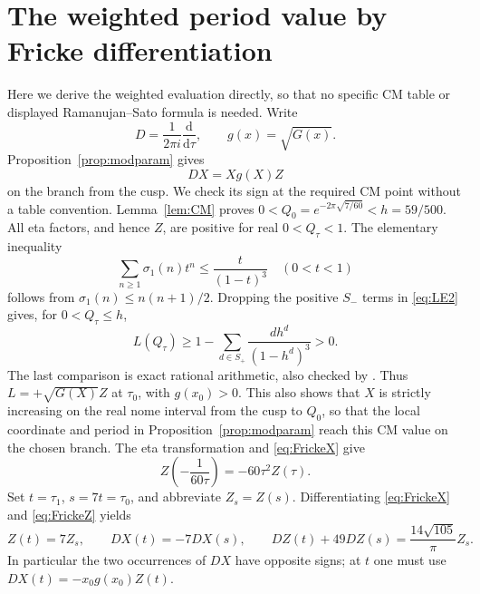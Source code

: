\documentclass[11pt,a4paper]{article}
\theoremstyle{remark}
\newcommand{\dd}{\mathrm d}
\newcommand{\code}[1]{\path{#1}}
\begin{document}
\section{The weighted period value by Fricke differentiation}
Here we derive the weighted evaluation directly, so that no specific
CM table or displayed Ramanujan--Sato formula is needed. Write
\[
 D=\frac1{2\pi i}\frac{\dd}{\dd\tau},\qquad g(x)=\sqrt{G(x)}.
\]
Proposition~\ref{prop:modparam} gives
\begin{equation}\label{eq:DX}
 DX=Xg(X)Z
\end{equation}
on the branch from the cusp. We check its sign at the required CM point
without a table convention. Lemma~\ref{lem:CM} proves
$0<Q_0=e^{-2\pi\sqrt{7/60}}<h=59/500$.
All eta factors, and hence $Z$, are positive for real $0<Q_\tau<1$.
The elementary inequality
\[
 \sum_{n\geq1}\sigma_1(n)t^n\leq\frac{t}{(1-t)^3}
 \quad(0<t<1)
\]
follows from $\sigma_1(n)\leq n(n+1)/2$. Dropping the positive
$S_-$ terms in \eqref{eq:LE2} gives, for $0<Q_\tau\leq h$,
\begin{equation}\label{eq:Lpositive}
 L(Q_\tau)\geq
 1-\sum_{d\in S_+}\frac{d h^d}{(1-h^d)^3}>0.
\end{equation}
The last comparison is exact rational arithmetic, also checked by
\code{sun90_modparam_verify.py}. Thus $L=+\sqrt{G(X)}Z$ at $\tau_0$,
with $g(x_0)>0$. This also shows that $X$ is strictly increasing on the
real nome interval from the cusp to $Q_0$, so that the local coordinate
and period in Proposition~\ref{prop:modparam} reach this CM value on
the chosen branch. The eta transformation
and \eqref{eq:FrickeX} give
\begin{equation}\label{eq:FrickeZ}
 Z\left(-\frac1{60\tau}\right)=-60\tau^2Z(\tau).
\end{equation}
Set $t=\tau_1$, $s=7t=\tau_0$, and abbreviate $Z_s=Z(s)$.
Differentiating \eqref{eq:FrickeX} and \eqref{eq:FrickeZ} yields
\begin{equation}\label{eq:FrickeD}
 Z(t)=7Z_s,\qquad DX(t)=-7DX(s),\qquad
 DZ(t)+49DZ(s)=\frac{14\sqrt{105}}{\pi}Z_s.
\end{equation}
In particular the two occurrences of $DX$ have opposite signs; at $t$
one must use $DX(t)=-x_0g(x_0)Z(t)$.
\end{document}
